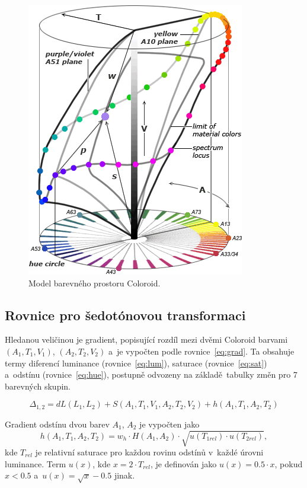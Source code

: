 \documentclass[11pt,a4paper,oneside]{article}
\begin{document}
	\begin{figure}[htb]
		\centering
		\includegraphics[scale=0.5]{fig/Coloroid.png}
		\caption{Model barevného prostoru Coloroid.} 
		\label{fig:coloroid}
	\end{figure}

	\subsection{Rovnice pro šedotónovou transformaci}
	Hledanou veličinou je gradient, popisující rozdíl mezi dvěmi Coloroid
	barvami $(A_1, T_1, V_1)$, $(A_2, T_2, V_2)$ a~je vypočten podle
	rovnice~\eqref{eq:grad}. Ta obsahuje termy diferencí luminance
	(rovnice~\eqref{eq:lum}), saturace (rovnice~\eqref{eq:sat}) a~odstínu
	(rovnice~\eqref{eq:hue}), postupně odvozeny na základě~tabulky změn
	pro 7 barevných skupin.

	\begin{equation}
		\Delta_{1, 2} = dL(L_1, L_2) + S(A_1, T_1, V_1, A_2, T_2, V_2) + h(A_1, T_1, A_2, T_2)
		\label{eq:grad}
	\end{equation}

	Gradient odstínu dvou barev $A_1$, $A_2$ je vypočten jako
	\begin{equation}
		h(A_1, T_1, A_2, T_2) = w_h \cdot H(A_1, A_2) \cdot \sqrt{u(T_{1rel}) \cdot u(T_{2rel})},
		\label{eq:hue}
	\end{equation}
	kde $T_{rel}$ je relativní saturace pro každou rovinu odstínů v~každé úrovni luminance.
	Term $u(x)$, kde $x = 2 \cdot T_{rel}$, je definován jako $u(x) = 0.5 \cdot x$, pokud $x < 0.5$
	a~$u(x) = \sqrt{x} - 0.5$ jinak.
\end{document}
